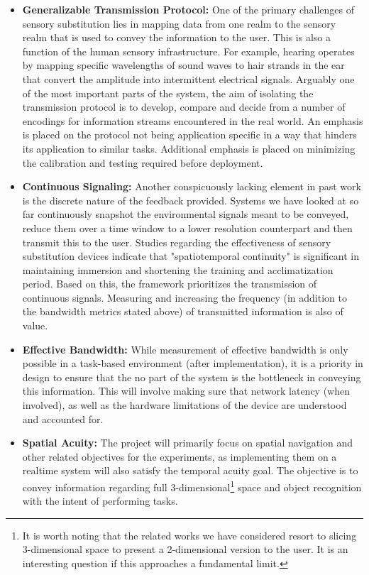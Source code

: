\documentclass[
12pt, %
oneside, %
english, %
doublespacing, %
headsepline, %
]{MastersDoctoralThesis} %
\begin{document}
\begin{itemize}
\item \textbf{Generalizable Transmission Protocol:} One of the primary challenges of sensory substitution lies in mapping data from one realm to the sensory realm that is used to convey the information to the user. This is also a function of the human sensory infrastructure. For example, hearing operates by mapping specific wavelengths of sound waves to hair strands in the ear that convert the amplitude into intermittent electrical signals. Arguably one of the most important parts of the system, the aim of isolating the transmission protocol is to develop, compare and decide from a number of encodings for information streams encountered in the real world. An emphasis is placed on the protocol not being application specific in a way that hinders its application to similar tasks. Additional emphasis is placed on minimizing the calibration and testing required before deployment.
\item \textbf{Continuous Signaling:} Another conspicuously lacking element in past work is the discrete nature of the feedback provided. Systems we have looked at so far continuously snapshot the environmental signals meant to be conveyed, reduce them over a time window to a lower resolution counterpart and then transmit this to the user. Studies \parencite{kristjansson_designing_nodate} regarding the effectiveness of sensory substitution devices indicate that "spatiotemporal continuity" is significant in maintaining immersion and shortening the training and acclimatization period. Based on this, the framework prioritizes the transmission of continuous signals. Measuring and increasing the frequency (in addition to the bandwidth metrics stated above) of transmitted information is also of value.
\item \textbf{Effective Bandwidth:} While measurement of effective bandwidth is only possible in a task-based environment (after implementation), it is a priority in design to ensure that the no part of the system is the bottleneck in conveying this information. This will involve making sure that network latency (when involved), as well as the hardware limitations of the device are understood and accounted for.
\item \textbf{Spatial Acuity: }The project will primarily focus on spatial navigation and other related objectives for the experiments, as implementing them on a realtime system will also satisfy the temporal acuity goal. The objective is to convey information regarding full 3-dimensional\footnote{It is worth noting that the related works we have considered resort to slicing 3-dimensional space to present a 2-dimensional version to the user. It is an interesting question if this approaches a fundamental limit.} space and object recognition with the intent of performing tasks.

\end{itemize}
\end{document}
